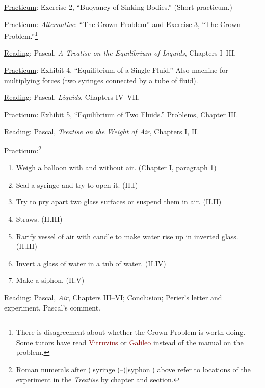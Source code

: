 \documentclass{article}
\newcommand{\rd}{\uline{Reading}}
\newcommand{\pc}{\uline{Practicum}}
\begin{document}
\begin{enumerate}
	\pc: Exercise 2, ``Buoyancy of Sinking Bodies.'' (Short practicum.)

	\pc: \emph{Alternative}: ``The Crown Problem'' and Exercise 3, ``The Crown Problem.''\footnote{There is disagreement about whether the Crown Problem is worth doing. Some tutors have read \hyperlink{Vitruvius.1}{\textcolor{Maroon}{Vitruvius}} or \hyperlink{Galileo.1}{\textcolor{Maroon}{Galileo}} instead of the manual on the problem.}


\item \rd:  Pascal, \emph{A Treatise on the Equilibrium of Liquids}, Chapters I--III. 

	\pc: Exhibit 4, ``Equilibrium of a Single Fluid.'' Also machine for multiplying forces (two syringes connected by a tube of fluid). 

\item \rd:  Pascal, \emph{Liquids}, Chapters IV--VII. 

	\pc: Exhibit 5, ``Equilibrium of Two Fluids.'' Problems, Chapter III.

\begin{minipage}{0.9\textwidth}
\item \rd:  Pascal, \emph{Treatise on the Weight of Air}, Chapters I, II. 

	\pc:\footnote{Roman numerals after (\ref{syringe})--(\ref{syphon}) above refer to locations of the experiment in the \emph{Treatise} by
	chapter and section.}
	\begin{enumerate}[nosep]
		\item Weigh a balloon with and without air. (Chapter I, paragraph 1)
		\item Seal a syringe and try to open it. (II.I)\label{syringe}
		\item Try to pry apart two glass surfaces or suspend them in air. (II.II)
		\item Straws. (II.III)
		\item Rarify vessel of air with candle to make water rise up in inverted glass. (II.III)
		\item Invert a glass of water in a tub of water. (II.IV)
		\item Make a siphon. (II.V)\label{syphon}
	\end{enumerate}
	\end{minipage}
\item \rd:\label{air}  Pascal, \emph{Air}, Chapters III--VI; Conclusion; Perier’s letter
and experiment, Pascal’s comment.
  

\end{enumerate}
\end{document}
